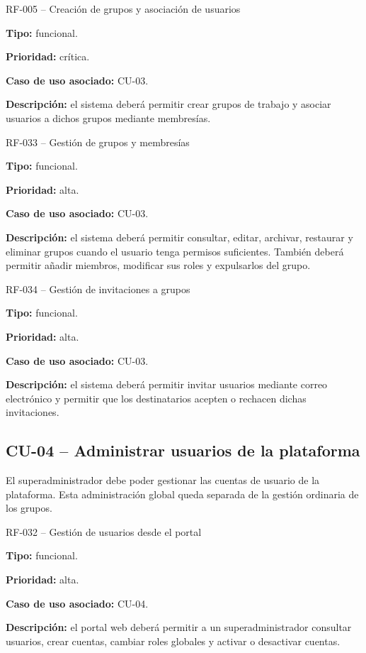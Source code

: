 \begin{requisitocard}{RF-005 -- Creación de grupos y asociación de usuarios}

\textbf{Tipo:} funcional.

\textbf{Prioridad:} crítica.

\textbf{Caso de uso asociado:} CU-03.

\textbf{Descripción:} el sistema deberá permitir crear grupos de trabajo y asociar
usuarios a dichos grupos mediante membresías.

\end{requisitocard}

\begin{requisitocard}{RF-033 -- Gestión de grupos y membresías}

\textbf{Tipo:} funcional.

\textbf{Prioridad:} alta.

\textbf{Caso de uso asociado:} CU-03.

\textbf{Descripción:} el sistema deberá permitir consultar, editar, archivar,
restaurar y eliminar grupos cuando el usuario tenga permisos suficientes. También
deberá permitir añadir miembros, modificar sus roles y expulsarlos del grupo.

\end{requisitocard}

\begin{requisitocard}{RF-034 -- Gestión de invitaciones a grupos}

\textbf{Tipo:} funcional.

\textbf{Prioridad:} alta.

\textbf{Caso de uso asociado:} CU-03.

\textbf{Descripción:} el sistema deberá permitir invitar usuarios mediante correo
electrónico y permitir que los destinatarios acepten o rechacen dichas
invitaciones.

\end{requisitocard}

\subsection{CU-04 -- Administrar usuarios de la plataforma}

El superadministrador debe poder gestionar las cuentas de usuario de la
plataforma. Esta administración global queda separada de la gestión ordinaria de
los grupos.

\begin{requisitocard}{RF-032 -- Gestión de usuarios desde el portal}

\textbf{Tipo:} funcional.

\textbf{Prioridad:} alta.

\textbf{Caso de uso asociado:} CU-04.

\textbf{Descripción:} el portal web deberá permitir a un superadministrador
consultar usuarios, crear cuentas, cambiar roles globales y activar o desactivar
cuentas.

\end{requisitocard}

